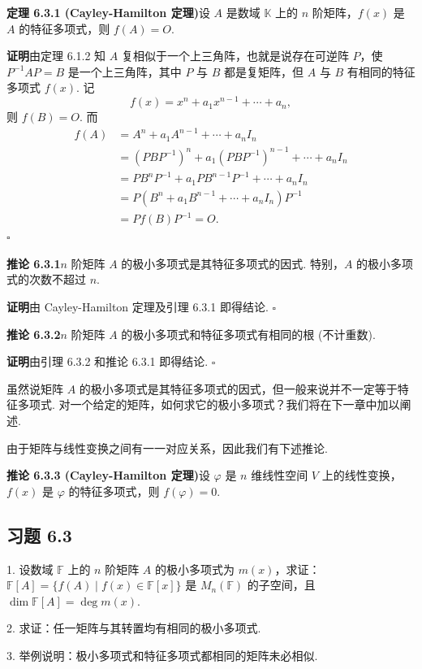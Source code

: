 \documentclass[UTF8,12pt,a4paper,fontset=fandol]{ctexart}
\begin{document}
\noindent\textbf{定理 6.3.1 (Cayley-Hamilton 定理)}\quad 设 $A$ 是数域 $\mathbb{K}$ 上的 $n$ 阶矩阵，$f(x)$ 是 $A$ 的特征多项式，则 $f(A)=O$.

\noindent\textbf{证明}\quad 由定理 6.1.2 知 $A$ 复相似于一个上三角阵，也就是说存在可逆阵 $P$，使 $P^{-1}AP=B$ 是一个上三角阵，其中 $P$ 与 $B$ 都是复矩阵，但 $A$ 与 $B$ 有相同的特征多项式 $f(x)$. 记
\[
f(x)=x^n+a_1x^{n-1}+\cdots+a_n,
\]
则 $f(B)=O$. 而
\[
\begin{aligned}
f(A)&=A^n+a_1A^{n-1}+\cdots+a_nI_n\\
&=(PBP^{-1})^n+a_1(PBP^{-1})^{n-1}+\cdots+a_nI_n\\
&=PB^nP^{-1}+a_1PB^{n-1}P^{-1}+\cdots+a_nI_n\\
&=P(B^n+a_1B^{n-1}+\cdots+a_nI_n)P^{-1}\\
&=Pf(B)P^{-1}=O.
\end{aligned}
\]
$\square$

\noindent\textbf{推论 6.3.1}\quad $n$ 阶矩阵 $A$ 的极小多项式是其特征多项式的因式. 特别，$A$ 的极小多项式的次数不超过 $n$.

\noindent\textbf{证明}\quad 由 Cayley-Hamilton 定理及引理 6.3.1 即得结论. $\square$

\noindent\textbf{推论 6.3.2}\quad $n$ 阶矩阵 $A$ 的极小多项式和特征多项式有相同的根 (不计重数).

\noindent\textbf{证明}\quad 由引理 6.3.2 和推论 6.3.1 即得结论. $\square$

虽然说矩阵 $A$ 的极小多项式是其特征多项式的因式，但一般来说并不一定等于特征多项式. 对一个给定的矩阵，如何求它的极小多项式？我们将在下一章中加以阐述.

由于矩阵与线性变换之间有一一对应关系，因此我们有下述推论.

\noindent\textbf{推论 6.3.3 (Cayley-Hamilton 定理)}\quad 设 $\varphi$ 是 $n$ 维线性空间 $V$ 上的线性变换，$f(x)$ 是 $\varphi$ 的特征多项式，则 $f(\varphi)=0$.

\subsection*{习题 6.3}

1. 设数域 $\mathbb{F}$ 上的 $n$ 阶矩阵 $A$ 的极小多项式为 $m(x)$，求证：$\mathbb{F}[A]=\{f(A)\mid f(x)\in\mathbb{F}[x]\}$ 是 $M_n(\mathbb{F})$ 的子空间，且 $\dim\mathbb{F}[A]=\deg m(x)$.

2. 求证：任一矩阵与其转置均有相同的极小多项式.

3. 举例说明：极小多项式和特征多项式都相同的矩阵未必相似.
\end{document}
